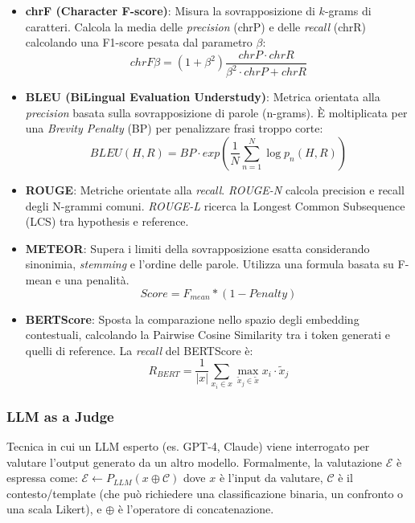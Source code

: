             \begin{itemize}
                \item \textbf{chrF (Character F-score)}: Misura la sovrapposizione di $k$-grams di caratteri. Calcola la media delle \textit{precision} (chrP) e delle \textit{recall} (chrR) calcolando una F1-score pesata dal parametro $\beta$:
                $$chrF\beta = (1+\beta^2)\frac{chrP \cdot chrR}{\beta^2 \cdot chrP + chrR}$$
                
                \item \textbf{BLEU (BiLingual Evaluation Understudy)}: Metrica orientata alla \textit{precision} basata sulla sovrapposizione di parole (n-grams). È moltiplicata per una \textit{Brevity Penalty} (BP) per penalizzare frasi troppo corte:
                $$BLEU(H,R) = BP \cdot exp\left(\frac{1}{N}\sum_{n=1}^{N} \log p_n(H,R)\right)$$
                
                \item \textbf{ROUGE}: Metriche orientate alla \textit{recall}. \textit{ROUGE-N} calcola precision e recall degli N-grammi comuni. \textit{ROUGE-L} ricerca la Longest Common Subsequence (LCS) tra hypothesis e reference.
                
                \item \textbf{METEOR}: Supera i limiti della sovrapposizione esatta considerando sinonimia, \textit{stemming} e l'ordine delle parole. Utilizza una formula basata su F-mean e una penalità.
                $$Score = F_{mean} * (1 - Penalty)$$
                
                \item \textbf{BERTScore}: Sposta la comparazione nello spazio degli embedding contestuali, calcolando la Pairwise Cosine Similarity tra i token generati e quelli di reference. La \textit{recall} del BERTScore è:
                $$R_{BERT} = \frac{1}{|x|} \sum_{x_i \in x} \max_{\tilde{x}_j \in \tilde{x}} x_i \cdot \tilde{x}_j$$
            \end{itemize}

        \subsubsection{LLM as a Judge}
        
            Tecnica in cui un LLM esperto (es. GPT-4, Claude) viene interrogato per valutare l'output generato da un altro modello. Formalmente, la valutazione $\mathcal{E}$ è espressa come:
            $\mathcal{E} \leftarrow P_{LLM}(x \oplus \mathcal{C})$
            dove $x$ è l'input da valutare, $\mathcal{C}$ è il contesto/template (che può richiedere una classificazione binaria, un confronto o una scala Likert), e $\oplus$ è l'operatore di concatenazione.

